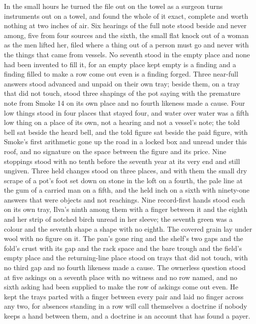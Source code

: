 In the small hours he turned the file out on the towel as a surgeon turns instruments out on a towel, and found the whole of it exact, complete and worth nothing at two inches of air. Six hearings of the full note stood beside and never among, five from four sources and the sixth, the small flat knock out of a woman as the men lifted her, filed where a thing out of a person must go and never with the things that came from vessels. No seventh stood in the empty place and none had been invented to fill it, for an empty place kept empty is a finding and a finding filled to make a row come out even is a finding forged. Three near-full answers stood advanced and unpaid on their own tray; beside them, on a tray that did not touch, stood three shapings of the pot saying with the premature note from Smoke 14 on its own place and no fourth likeness made a cause. Four low things stood in four places that stayed four, and water over water was a fifth low thing on a place of its own, not a hearing and not a vessel's note; the told bell sat beside the heard bell, and the told figure sat beside the paid figure, with Smoke's first arithmetic gone up the road in a locked box and unread under this roof, and no signature on the space between the figure and its price. Nine stoppings stood with no tenth before the seventh year at its very end and still ungiven. Three held changes stood on three places, and with them the small dry scrape of a pot's foot set down on stone in the loft on a fourth, the pale line at the gum of a carried man on a fifth, and the held inch on a sixth with ninety-one answers that were objects and not reachings. Nine record-first hands stood each on its own tray, Ilva's ninth among them with a finger between it and the eighth and her strip of notched birch unread in her sleeve; the seventh green was a colour and the seventh shape a shape with no eighth. The covered grain lay under wool with no figure on it. The pan's gone ring and the shelf's two gaps and the fold's crust with its gap and the rack space and the bare trough and the field's empty place and the returning-line place stood on trays that did not touch, with no third gap and no fourth likeness made a cause. The ownerless question stood at five askings on a seventh place with no witness and no row named, and no sixth asking had been supplied to make the row of askings come out even. He kept the trays parted with a finger between every pair and laid no finger across any two, for absences standing in a row will call themselves a doctrine if nobody keeps a hand between them, and a doctrine is an account that has found a payer.

